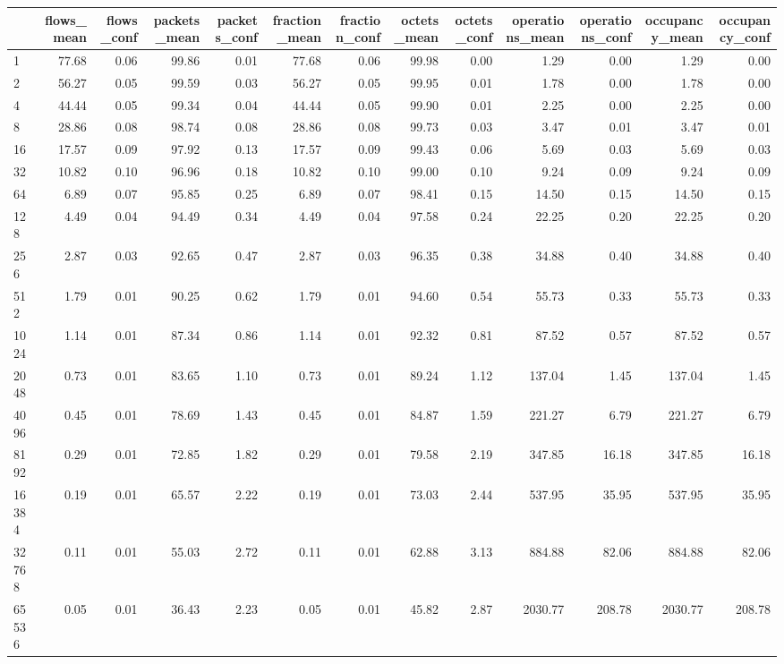\begin{tabular}{lrrrrrrrrrrrr}
\toprule
 & flows_mean & flows_conf & packets_mean & packets_conf & fraction_mean & fraction_conf & octets_mean & octets_conf & operations_mean & operations_conf & occupancy_mean & occupancy_conf \\
\midrule
1 & 77.68 & 0.06 & 99.86 & 0.01 & 77.68 & 0.06 & 99.98 & 0.00 & 1.29 & 0.00 & 1.29 & 0.00 \\
2 & 56.27 & 0.05 & 99.59 & 0.03 & 56.27 & 0.05 & 99.95 & 0.01 & 1.78 & 0.00 & 1.78 & 0.00 \\
4 & 44.44 & 0.05 & 99.34 & 0.04 & 44.44 & 0.05 & 99.90 & 0.01 & 2.25 & 0.00 & 2.25 & 0.00 \\
8 & 28.86 & 0.08 & 98.74 & 0.08 & 28.86 & 0.08 & 99.73 & 0.03 & 3.47 & 0.01 & 3.47 & 0.01 \\
16 & 17.57 & 0.09 & 97.92 & 0.13 & 17.57 & 0.09 & 99.43 & 0.06 & 5.69 & 0.03 & 5.69 & 0.03 \\
32 & 10.82 & 0.10 & 96.96 & 0.18 & 10.82 & 0.10 & 99.00 & 0.10 & 9.24 & 0.09 & 9.24 & 0.09 \\
64 & 6.89 & 0.07 & 95.85 & 0.25 & 6.89 & 0.07 & 98.41 & 0.15 & 14.50 & 0.15 & 14.50 & 0.15 \\
128 & 4.49 & 0.04 & 94.49 & 0.34 & 4.49 & 0.04 & 97.58 & 0.24 & 22.25 & 0.20 & 22.25 & 0.20 \\
256 & 2.87 & 0.03 & 92.65 & 0.47 & 2.87 & 0.03 & 96.35 & 0.38 & 34.88 & 0.40 & 34.88 & 0.40 \\
512 & 1.79 & 0.01 & 90.25 & 0.62 & 1.79 & 0.01 & 94.60 & 0.54 & 55.73 & 0.33 & 55.73 & 0.33 \\
1024 & 1.14 & 0.01 & 87.34 & 0.86 & 1.14 & 0.01 & 92.32 & 0.81 & 87.52 & 0.57 & 87.52 & 0.57 \\
2048 & 0.73 & 0.01 & 83.65 & 1.10 & 0.73 & 0.01 & 89.24 & 1.12 & 137.04 & 1.45 & 137.04 & 1.45 \\
4096 & 0.45 & 0.01 & 78.69 & 1.43 & 0.45 & 0.01 & 84.87 & 1.59 & 221.27 & 6.79 & 221.27 & 6.79 \\
8192 & 0.29 & 0.01 & 72.85 & 1.82 & 0.29 & 0.01 & 79.58 & 2.19 & 347.85 & 16.18 & 347.85 & 16.18 \\
16384 & 0.19 & 0.01 & 65.57 & 2.22 & 0.19 & 0.01 & 73.03 & 2.44 & 537.95 & 35.95 & 537.95 & 35.95 \\
32768 & 0.11 & 0.01 & 55.03 & 2.72 & 0.11 & 0.01 & 62.88 & 3.13 & 884.88 & 82.06 & 884.88 & 82.06 \\
65536 & 0.05 & 0.01 & 36.43 & 2.23 & 0.05 & 0.01 & 45.82 & 2.87 & 2030.77 & 208.78 & 2030.77 & 208.78 \\

\end{tabular}
